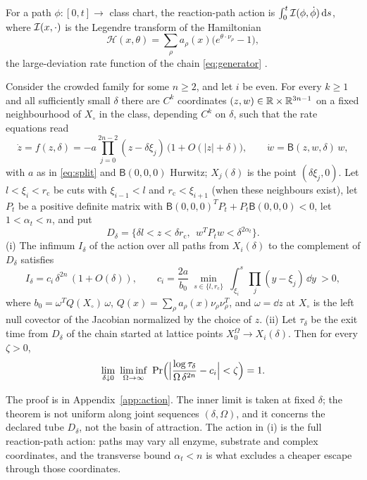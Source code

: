 For a path \(\phi:[0,t]\to\) class chart, the reaction-path action is
\(\int_0^t\mathcal I(\phi,\dot\phi)\,\mathrm d s\), where \(\mathcal I(x,\cdot)\) is the Legendre transform of the
Hamiltonian
\begin{equation}\label{eq:hamiltonian}
 \mathcal H(x,\theta)=\sum_\rho a_\rho(x)\bigl(e^{\theta\cdot\nu_\rho}-1\bigr),
\end{equation}
the large-deviation rate function of the chain \eqref{eq:generator}
\cite{ShwartzWeiss1995,FreidlinWentzell,AgazziDemboEckmann2018}.

\begin{theorem}\label{thm:action}
Consider the crowded family for some \(n\ge2\), and let \(i\) be even. For every
\(k\ge1\) and all sufficiently small \(\delta\) there are \(C^k\) coordinates \((z,w)\in
\mathbb R\times\mathbb R^{3n-1}\) on a fixed neighbourhood of \(X_\circ\) in the class, depending \(C^k\) on
\(\delta\), such that the rate equations read
\begin{equation}\label{eq:normalform}
 \dot z=f(z,\delta)=-a\prod_{j=0}^{2n-2}(z-\delta\xi_j)\,\bigl(1+O(|z|+\delta)\bigr),\qquad
 \dot w=\mathsf B(z,w,\delta)\,w ,
\end{equation}
with \(a\) as in \eqref{eq:split} and \(\mathsf B(0,0,0)\) Hurwitz; \(X_j(\delta)\) is the point
\((\delta\xi_j,0)\). Let \(l<\xi_i<r_{\mathrm c}\) be cuts with
\(\xi_{i-1}<l\) and \(r_{\mathrm c}<\xi_{i+1}\) (when these neighbours exist), let \(P_t\) be a
positive definite matrix with \(\mathsf B(0,0,0)^TP_t+P_t\mathsf B(0,0,0)<0\), let
\(1<\alpha_t<n\), and put
\[
 D_\delta=\bigl\{\delta l<z<\delta r_{\mathrm c},\ \ w^TP_tw<\delta^{2\alpha_t}\bigr\}.
\]
\textup{(i)} The infimum \(I_\delta\) of the action over all paths from \(X_i(\delta)\) to the
complement of \(D_\delta\) satisfies
\begin{equation}\label{eq:action}
 I_\delta=c_i\,\delta^{2n}\,(1+O(\delta)),\qquad
 c_i=\frac{2a}{b_0}\ \min_{s\in\{l,r_{\mathrm c}\}}\ \int_{\xi_i}^{s}\prod_{j}(y-\xi_j)\,\dd y\ >0,
\end{equation}
where \(b_0=\omega^TQ(X_\circ)\,\omega\), \(Q(x)=\sum_\rho a_\rho(x)\nu_\rho\nu_\rho^T\), and
\(\omega=\dd z\) at \(X_\circ\) is the left null covector of the Jacobian normalized by the
choice of \(z\). \textup{(ii)} Let \(\tau_\delta\) be the exit time from \(D_\delta\) of the
chain started at lattice points \(X_0^\Omega\to X_i(\delta)\). Then for every \(\zeta>0\),
\begin{equation}\label{eq:iterated}
 \lim_{\delta\downarrow0}\ \liminf_{\Omega\to\infty}\
 \Pr\Bigl(\Bigl|\frac{\log\tau_\delta}{\Omega\,\delta^{2n}}-c_i\Bigr|<\zeta\Bigr)=1 .
\end{equation}
\end{theorem}
The proof is in Appendix~\ref{app:action}. The inner limit is taken at fixed \(\delta\); the
theorem is not uniform along joint sequences \((\delta,\Omega)\), and it concerns the declared
tube \(D_\delta\), not the basin of attraction. The action in (i) is the full reaction-path
action: paths may vary all enzyme, substrate and complex coordinates, and the transverse bound
\(\alpha_t<n\) is what excludes a cheaper escape through those coordinates.

